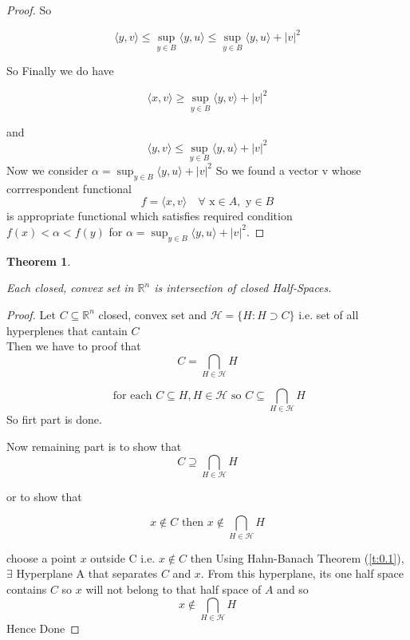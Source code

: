 \documentclass[oneside]{book}
\newtheorem{theorem}{Theorem}[section]
\begin{document}
\begin{proof}
		
		So
		
		$$ \langle y, v\rangle  \leqslant \sup _{y \in B}\langle y, u\rangle \leqslant  \sup _{y \in B}\langle y, u\rangle + |v|^{2} $$
		
		So Finally we do have 
		
		\begin{equation}
		\label{eq4.2}
		\langle x, v \rangle \geqslant\sup_{y\in B}\langle y, v\rangle+|v|^{2}
		\end{equation}
		
		
		and 
		\begin{equation}
		\langle y, v\rangle  \leqslant \sup _{y \in B}\langle y, u\rangle + |v|^{2}
		\end{equation}
		Now we consider  $\alpha =  \sup _{y \in B}\langle y, u\rangle + |v|^{2}$ 
		So we found a vector v whose \\
		corrrespondent functional 
		\\ $$f = \langle x, v\rangle \quad  
		\forall \text{ x} \in A, \text{ y} \in B $$ is 
		appropriate functional which satisfies required condition \\ $f(x)<\alpha < f(y)$
		for 
		$\alpha =  \sup _{y \in B}\langle y, u\rangle + |v|^{2}$. 
	\end{proof}
	
	
	
	
	
	
	\begin{theorem}
		\label{t:0.2}
		
		Each   closed, convex set  in  $\mathbb{R}^{n}$ is intersection of closed Half-Spaces.
		
	\end{theorem}
	
	
	
	
	
	\begin{proof}
		
		
		
		
		
		Let 
		$ C\subseteq \mathbb{R}^{n}$ closed, convex set and $\mathcal{H}=\{H: H\supset C\}$ i.e. set of all hyperplenes that cantain $C$ \\
		Then we have to proof that
		$$ C = \bigcap_{H \in \mathcal{H}} H $$
		
		
		$$\text{ for each } C \subseteq  H, H \in \mathcal{H} \text{ so } C \subseteq \bigcap_{ H \in \mathcal{H}} H $$
		So firt part is done.
		\hfill \break
		
		Now remaining part is to show that
		$$ C \supseteq \bigcap_{ H \in \mathcal{H}} H $$
		

		or to show that 
		
		$$ x \notin C \text { then } x \notin \bigcap_{H \in \mathcal{H}} H$$
		
		
		
		choose a point $x$ outside C  i.e. $x \notin C$
		then Using Hahn-Banach Theorem (\ref{t:0.1}), $\exists$ Hyperplane A that separates $C$ and $x$.
		From this hyperplane, its one half space contains $C$ so $x$ will not belong to that half space of $A$ and so 
		$$ x \notin \bigcap_{H \in \mathcal{H}} H $$
		Hence Done
		
	\end{proof}
	
\end{document}
